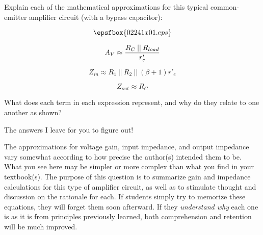 

Explain each of the mathematical approximations for this typical common-emitter amplifier circuit (with a bypass capacitor):

$$\epsfbox{02241x01.eps}$$

$$A_V \approx {R_C \> || \> R_{load} \over r'_e}$$

$$Z_{in} \approx R_1 \> || \> R_2 \> || \> (\beta + 1)r'_e$$

$$Z_{out} \approx R_C$$

What does each term in each expression represent, and why do they relate to one another as shown?







The answers I leave for you to figure out!







The approximations for voltage gain, input impedance, and output impedance vary somewhat according to how precise the author(s) intended them to be.  What you see here may be simpler or more complex than what you find in your textbook(s).  The purpose of this question is to summarize gain and impedance calculations for this type of amplifier circuit, as well as to stimulate thought and discussion on the rationale for each.  If students simply try to memorize these equations, they will forget them soon afterward.  If they {\it understand why} each one is as it is from principles previously learned, both comprehension and retention will be much improved.




